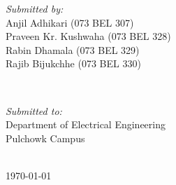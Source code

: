 \begin{titlepage}
	\begin{minipage}{0.4\textwidth}
		\begin{flushleft} 
			\emph{Submitted by:}\\
			Anjil Adhikari (073 BEL 307)\\
			Praveen Kr. Kushwaha (073 BEL 328)\\
			Rabin Dhamala (073 BEL 329)\\
			Rajib Bijukchhe (073 BEL 330)\\
		\end{flushleft}
	\end{minipage}
	~	
	\begin{minipage}{0.4\textwidth}
		\begin{center} 
			\emph{Submitted to:} \\
			Department of Electrical Engineering \\
			Pulchowk Campus
		\end{center}
	\end{minipage}\\[2cm]



	{\large \today}\\[2cm] %




	\vfill %
\end{titlepage}

